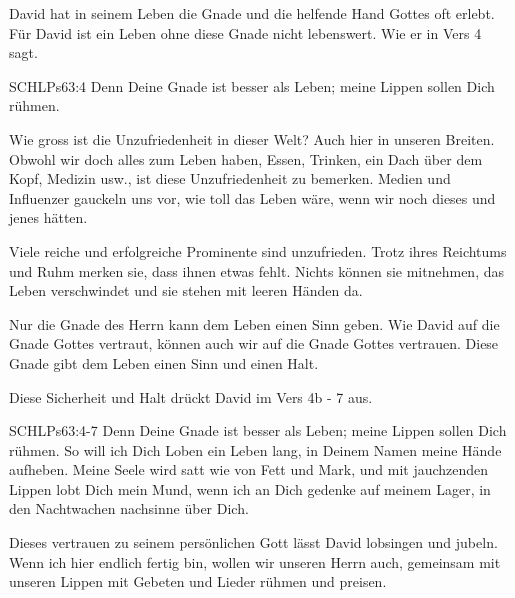 \documentclass[14pt]{../../inc/mybib}
\begin{document}
    \begin{block}
        David hat in seinem Leben die Gnade und die helfende Hand Gottes oft erlebt. Für David ist ein Leben ohne diese Gnade nicht lebenswert. Wie er in Vers 4 sagt.
        \begin{bibelbox}{SCHL}{Ps}{63:4}
            Denn Deine Gnade ist besser als Leben; meine Lippen sollen Dich rühmen.
        \end{bibelbox}

        Wie gross ist die Unzufriedenheit in dieser Welt? Auch hier in unseren Breiten. Obwohl wir doch alles zum Leben haben, Essen, Trinken, ein Dach über dem Kopf, Medizin usw., ist diese Unzufriedenheit zu bemerken. Medien und Influenzer gauckeln uns vor, wie toll das Leben wäre, wenn wir noch dieses und jenes hätten.
        
        Viele reiche und erfolgreiche Prominente sind unzufrieden. Trotz ihres Reichtums und Ruhm merken sie, dass ihnen etwas fehlt. Nichts können sie mitnehmen, das Leben verschwindet und sie stehen mit leeren Händen da.
        
        Nur die Gnade des Herrn kann dem Leben einen Sinn geben. Wie David auf die Gnade Gottes vertraut, können auch wir auf die Gnade Gottes vertrauen. Diese Gnade gibt dem Leben einen Sinn und einen Halt. 
    \end{block}

    \begin{block}
        Diese Sicherheit und Halt drückt David im Vers 4b - 7 aus.
        \begin{bibelbox}{SCHL}{Ps}{63:4-7}
            Denn Deine Gnade ist besser als Leben; meine Lippen sollen Dich rühmen. So will ich Dich Loben ein Leben lang, in Deinem Namen meine Hände aufheben. Meine Seele wird satt wie von Fett und Mark, und mit jauchzenden Lippen lobt Dich mein Mund, wenn ich an Dich gedenke auf meinem Lager, in den Nachtwachen nachsinne über Dich.
        \end{bibelbox}

        Dieses vertrauen zu seinem persönlichen Gott lässt David lobsingen und jubeln.
        Wenn ich hier endlich fertig bin, wollen wir unseren Herrn auch, gemeinsam mit unseren Lippen mit Gebeten und Lieder rühmen und preisen.
    \end{block}    
\end{document}
